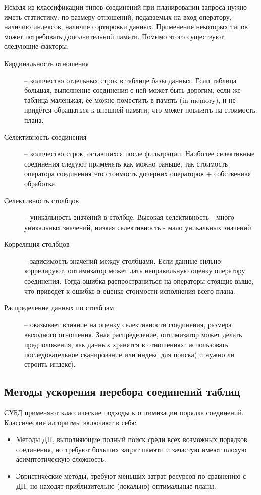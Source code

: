 \documentclass[12pt]{article}
\begin{document}
\begin{flushleft}
Исходя из классификации типов соединений при планировании запроса нужно иметь 
статистику: по размеру отношений, подаваемых на вход оператору, наличию индексов, наличие сортировки данных. 
Применение некоторых типов может потребовать дополнительной памяти.
Помимо этого существуют следующие факторы:
\begin{description}
    \item[Кардинальность отношения] -- количество отдельных строк 
    в таблице базы данных. Если таблица большая, выполнение соединения с ней может 
    быть дорогим, если же таблица маленькая, её можно поместить в память (in-memory), 
    и не придётся обращаться к внешней памяти, что может повлиять на стоимость.
    плана.
    \item[Селективность соединения] -- количество строк, оставшихся после фильтрации. 
    Наиболее селективные соединения следуют применять как можно раньше, так стоимость 
    оператора соединения это стоимость дочерних операторов $+$ собственная обработка.
    \item[Селективность столбцов] -- уникальность значений в столбце. 
    Высокая селективность - много уникальных значений, низкая селективность - мало уникальных значений.
    \item[Корреляция столбцов] -- зависимость значений между столбцами. 
    Если данные сильно коррелируют, оптимизатор может дать неправильную оценку 
    оператору соединения. Тогда ошибка распространиться на операторы стоящие выше,
    что приведёт к ошибке в оценке стоимости исполнения всего плана.
    \item[Распределение данных по столбцам] -- оказывает влияние на оценку селективности
    соединения, размера выходного отношения. Зная распределение, оптимизатор может делать предположения, как
    данных хранятся в отношениях:  использовать последовательное
    сканирование или индекс для поиска( и нужно ли строить индекс).
\end{description}
\centering \subsection*{Методы ускорения перебора соединений таблиц}
\raggedright

СУБД применяют классические подходы к оптимизации 
порядка соединений.
\newline
Классические алгоритмы включают в себя:
\begin{itemize}
\item Методы ДП, выполняющие полный поиск среди всех возможных порядков
соединения, но требуют больших затрат памяти и зачастую имеют плохую
асимптотическую сложность.
\item Эвристические методы, требуют меньших затрат ресурсов по сравнению
с ДП, но находят приблизительно (локально) оптимальные планы.
\end{itemize}


\end{flushleft}
\end{document}
